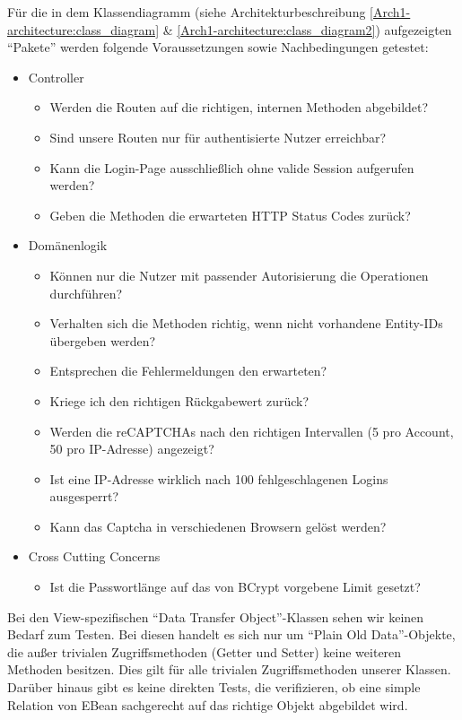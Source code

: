 \documentclass[12pt,DIV14,BCOR10mm,a4paper,parskip=half-,headsepline,headinclude,english,ngerman,bibliography=totocnumbered]{scrreprt}
\begin{document}

Für die in dem Klassendiagramm (siehe Architekturbeschreibung \ref{Arch1-architecture:class_diagram} \& \ref{Arch1-architecture:class_diagram2}) aufgezeigten \enquote{Pakete} werden folgende Voraussetzungen sowie Nachbedingungen getestet:

\begin{itemize}
  \item Controller
  \begin{itemize}
    \item Werden die Routen auf die richtigen, internen Methoden abgebildet?
    \item Sind unsere Routen nur für authentisierte Nutzer erreichbar?
    \item Kann die Login-Page ausschließlich ohne valide Session aufgerufen werden?
    \item Geben die Methoden die erwarteten HTTP Status Codes zurück?
  \end{itemize}

  \item Domänenlogik
  \begin{itemize}
    \item Können nur die Nutzer mit passender Autorisierung die Operationen durch\-führen?
    \item Verhalten sich die Methoden richtig, wenn nicht vorhandene Entity-IDs über\-geben werden?
    \item Entsprechen die Fehlermeldungen den erwarteten?
    \item Kriege ich den richtigen Rückgabewert zurück?
    \item Werden die reCAPTCHAs nach den richtigen Intervallen (5 pro Account, 50 pro IP-Adresse) angezeigt?
    \item Ist eine IP-Adresse wirklich nach 100 fehlgeschlagenen Logins ausgesperrt?
    \item Kann das Captcha in verschiedenen Browsern gelöst werden?
  \end{itemize}

  \item Cross Cutting Concerns
  \begin{itemize}
    \item Ist die Passwortlänge auf das von BCrypt vorgebene Limit gesetzt?
  \end{itemize}
\end{itemize}

Bei den View-spezifischen \enquote{Data Transfer Object}-Klassen sehen wir keinen Bedarf zum Testen.
Bei diesen handelt es sich nur um \enquote{Plain Old Data}-Objekte, die außer trivialen Zugriffsmethoden (Getter und Setter) keine weiteren Methoden besitzen.
Dies gilt für alle trivialen Zugriffsmethoden unserer Klassen. \newline
Darüber hinaus gibt es keine direkten Tests, die verifizieren, ob eine simple Relation von EBean sachgerecht auf das richtige Objekt abgebildet wird.
\end{document}
